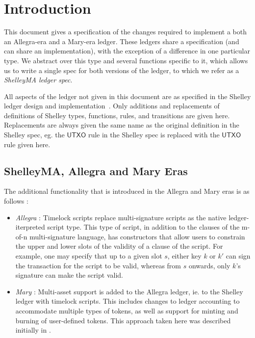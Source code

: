 \section{Introduction}

This document gives a specification of the changes
required to implement a both an Allegra-era and a Mary-era ledger. These ledgers share
a specification (and can share an implementation), with the exception of
a difference in one particular type. We abstract over this type and several
functions specific to it, which allows us to write a single spec for both versions of the
ledger, to which we refer as a \emph{ShelleyMA ledger spec}.

All aspects of the ledger not given in this document are as specified
in the Shelley ledger design and implementation~\cite{shelley_spec}.
Only additions and replacements of definitions of Shelley types, functions, rules, and transitions
are given here. Replacements are always given the same name as the
original definition in the Shelley spec, eg. the $\mathsf{UTXO}$ rule in the
Shelley spec is replaced with the $\mathsf{UTXO}$ rule given here.

\subsection{ShelleyMA, Allegra and Mary Eras}

The additional functionality that is introduced in the Allegra and Mary eras
is as follows :

\begin{itemize}
  \item \emph{Allegra} : Timelock scripts replace multi-signature scripts as the native
  ledger-iterpreted script type. This type of script, in addition to the
  clauses of the m-of-n multi-signature language, has constructors that
  allow users to constrain the upper and lower slots of the validity of a
  clause of the script. For example, one may specify that up to a given slot $s$,
  either key $k$ or $k'$ can sign the transaction for the script to be valid,
  whereas from $s$ onwards, only $k$'s signature can make the script valid.

  \item \emph{Mary} : Multi-asset support is added to the Allegra ledger, ie.
  to the Shelley ledger with timelock scripts. This includes changes to
  ledger accounting to accommodate multiple types of tokens, as well as
  support for minting and burning of user-defined tokens. This approach
  taken here was described initially in \cite{utxo_ma}.
\end{itemize}

